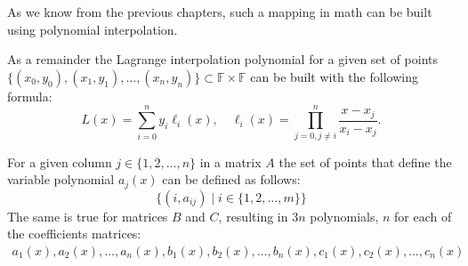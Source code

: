 \documentclass[../lecture-notes.tex]{subfiles}
\begin{document}
As we know from the previous chapters, such a mapping in math can be built using polynomial 
interpolation.

\begin{remark}
    As a remainder the Lagrange interpolation polynomial for a given set of points 
    $\{(x_0,y_0),(x_1,y_1),\dots,(x_n,y_n)\} \subset \mathbb{F} \times \mathbb{F}$
    can be built with the following formula:
    \begin{equation*}
        L(x) = \sum_{i=0}^{n} y_i \ell_i(x), \quad \ell_i(x) = \prod_{j=0, j \neq i}^{n} \frac{x-x_j}{x_i-x_j}.
    \end{equation*}  
\end{remark}

For a given column $j \in \{1, 2, \dots, n\}$ in a matrix $A$ the set of points that define the
variable polynomial $a_j(x)$ can be defined as follows:
\begin{equation*}
    \{(i, a_{ij}) \mid i \in \{1, 2, \dots, m\}\}
\end{equation*}
The same is true for matrices $B$ and $C$, resulting in $3n$ polynomials, $n$ for each of the
coefficients matrices:
\begin{align*}
    a_1(x), a_2(x), \dots, a_n(x), 
    b_1(x), b_2(x), \dots, b_n(x),
    c_1(x), c_2(x), \dots, c_n(x)
\end{align*}
\end{document}
